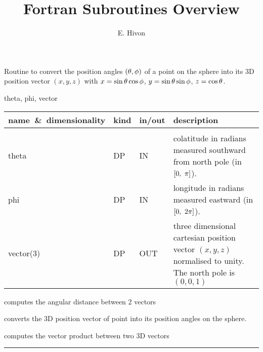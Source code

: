 

\sloppy


\title{\healpix Fortran Subroutines Overview}
 \section[ang2vec]{ }
\label{sub:ang2vec}
\author{E. Hivon}

\begin{facility}
{Routine to convert the position angles $(\theta,\phi)$ of a point on the sphere 
into its 3D position vector $(x,y,z)$ with
$x = \sin\theta\cos\phi$, $y=\sin\theta\sin\phi$, $z=\cos\theta$. 
}
{\modPixTools}
\end{facility}

\begin{f90format}
{theta, phi, vector}
\end{f90format}


\begin{arguments}
{
\begin{tabular}{p{0.3\hsize} p{0.05\hsize} p{0.1\hsize} p{0.45\hsize}} \hline  
\textbf{name~\&~dimensionality} & \textbf{kind} & \textbf{in/out} & \textbf{description} \\ \hline
                   &   &   &                           \\ %
theta & DP & IN & colatitude in radians measured southward from north pole (in
    $[0,\ \pi]\myhtmlimage{}$). \\
phi   & DP & IN & longitude in radians measured eastward (in $[0,\ 2\pi]$).\\
vector(3) & DP & OUT & three dimensional cartesian position vector
                   $(x,y,z)$ normalised to unity. The north pole is $(0,0,1)$
\end{tabular}
}
\end{arguments}


\begin{related}
  \begin{sulist}{} %
  \item[\htmlref{angdist}{sub:angdist}] computes the angular distance between 2 vectors
  \item[\htmlref{vec2ang}{sub:vec2ang}] converts the 3D position vector of point into its position
  angles on the sphere.
  \item[\htmlref{vect\_prod}{sub:vect_prod}] computes the vector product between two 3D vectors
  \end{sulist}
\end{related}

\rule{\hsize}{2mm}

